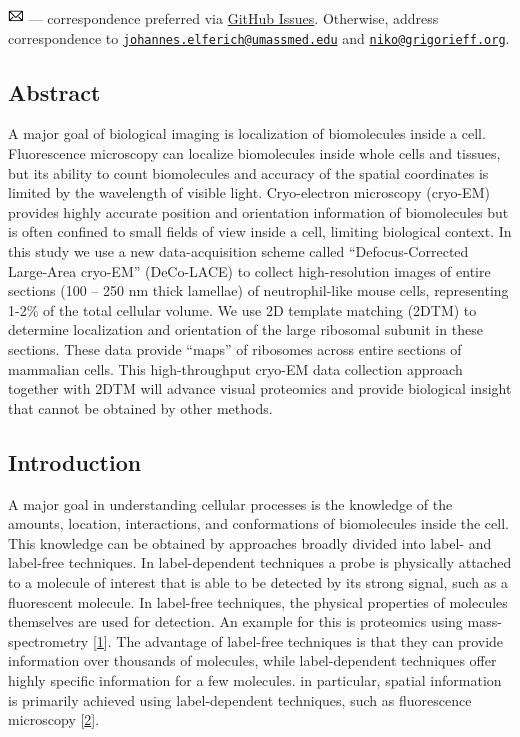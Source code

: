 \documentclass[
]{article}
\begin{document}
\leavevmode{}%
\includegraphics[width=0.16667in,height=0.16667in]{images/envelope.pdf} --- correspondence preferred via \href{https://github.com/jojoelfe/deco_lace_template_matching_manuscript/issues}{GitHub
Issues}.
Otherwise, address correspondence to \href{mailto:johannes.elferich@umassmed.edu}{\nolinkurl{johannes.elferich@umassmed.edu}}
and \href{mailto:niko@grigorieff.org}{\nolinkurl{niko@grigorieff.org}}.

\hypertarget{abstract}{%
\subsection{Abstract}\label{abstract}}

A major goal of biological imaging is localization of biomolecules
inside a cell. Fluorescence microscopy can localize biomolecules inside
whole cells and tissues, but its ability to count biomolecules and
accuracy of the spatial coordinates is limited by the wavelength of
visible light. Cryo-electron microscopy (cryo-EM) provides highly
accurate position and orientation information of biomolecules but is
often confined to small fields of view inside a cell, limiting
biological context. In this study we use a new data-acquisition scheme
called ``Defocus-Corrected Large-Area cryo-EM'' (DeCo-LACE) to collect
high-resolution images of entire sections (100 -- 250 nm thick lamellae)
of neutrophil-like mouse cells, representing 1-2\% of the total cellular
volume. We use 2D template matching (2DTM) to determine localization and
orientation of the large ribosomal subunit in these sections. These data
provide ``maps'' of ribosomes across entire sections of mammalian cells.
This high-throughput cryo-EM data collection approach together with 2DTM
will advance visual proteomics and provide biological insight that
cannot be obtained by other methods.

\hypertarget{introduction}{%
\subsection{Introduction}\label{introduction}}

A major goal in understanding cellular processes is the knowledge of the
amounts, location, interactions, and conformations of biomolecules
inside the cell. This knowledge can be obtained by approaches broadly
divided into label- and label-free techniques. In label-dependent
techniques a probe is physically attached to a molecule of interest that
is able to be detected by its strong signal, such as a fluorescent
molecule. In label-free techniques, the physical properties of molecules
themselves are used for detection. An example for this is proteomics
using mass-spectrometry {[}\protect\hyperlink{ref-tSXIKPl7}{1}{]}. The advantage of
label-free techniques is that they can provide information over
thousands of molecules, while label-dependent techniques offer highly
specific information for a few molecules. in particular, spatial
information is primarily achieved using label-dependent techniques, such
as fluorescence microscopy {[}\protect\hyperlink{ref-VBmW7Aot}{2}{]}.
\end{document}
